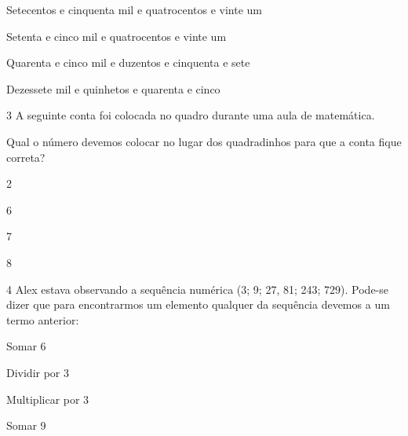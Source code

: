 \begin{escolha}
\item
  Setecentos e cinquenta mil e quatrocentos e vinte um
\item
  Setenta e cinco mil e quatrocentos e vinte um
\item
  Quarenta e cinco mil e duzentos e cinquenta e sete
\item
  Dezessete mil e quinhetos e quarenta e cinco
\end{escolha}


\num{3} A seguinte conta foi colocada no quadro durante uma aula de
matemática.


Qual o número devemos colocar no lugar dos quadradinhos para que a conta
fique correta?

\begin{escolha}
\item
  2
\item
  6
\item
  7
\item
  8
\end{escolha}


\num{4} Alex estava observando a sequência numérica (3; 9; 27, 81; 243;
729). Pode-se dizer que para encontrarmos um elemento qualquer da
sequência devemos a um termo anterior:

\begin{escolha}
\item
  Somar 6
\item
  Dividir por 3
\item
  Multiplicar por 3
\item
  Somar 9
\end{escolha}


